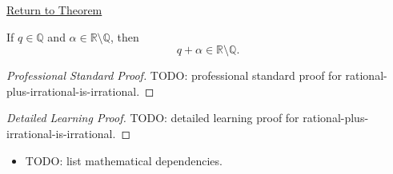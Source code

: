 \newpage
{}
\label{prf:rational-plus-irrational-is-irrational}

\begin{remark*}[Return]
\hyperref[thm:rational-plus-irrational-is-irrational]{Return to Theorem}
\end{remark*}

\begin{theorem*}
If $q\in\mathbb{Q}$ and $\alpha\in\mathbb{R}\setminus\mathbb{Q}$, then
\[
q+\alpha\in\mathbb{R}\setminus\mathbb{Q}.
\]
\end{theorem*}

\begin{proof}[Professional Standard Proof]
\LRAProofBodyStart
TODO: professional standard proof for rational-plus-irrational-is-irrational.
\end{proof}

\begin{proof}[Detailed Learning Proof]
\LRAProofBodyStart
TODO: detailed learning proof for rational-plus-irrational-is-irrational.
\end{proof}

\begin{remark*}
\end{remark*}

\begin{dependencies}
\begin{itemize}
  \item TODO: list mathematical dependencies.
\end{itemize}
\end{dependencies}

\clearpage
